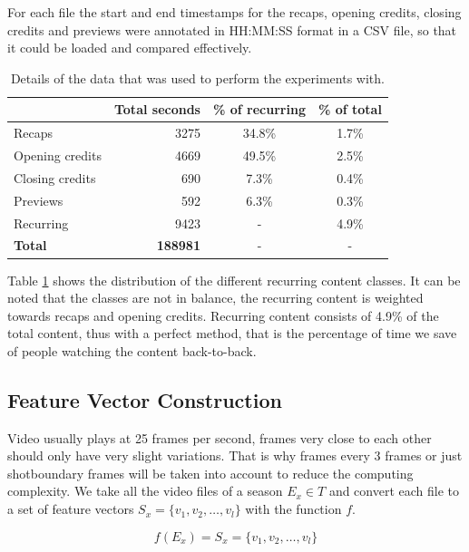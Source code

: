 \documentclass{article}
\begin{document}
For each file the start and end timestamps for the recaps, opening credits, closing credits and previews were annotated in HH:MM:SS format in a CSV file, so that it could be loaded and compared effectively.

\begin{table}[h]
	\begin{adjustwidth}{-.5in}{-.5in}  
		\begin{center}
			\begin{tabular}{ l | r c c}
								& Total seconds & \% of recurring 	& \% of total \\
				\hline
				Recaps 			& 3275 			& 34.8\% 			& 1.7\% \\
				Opening credits	& 4669			& 49.5\%			& 2.5\%	\\
				Closing credits	& 690			& 7.3\%				& 0.4\%	\\
				Previews		& 592			& 6.3\%				& 0.3\% \\
				\hline
				Recurring		& 9423			& -					& 4.9\% \\
				\textbf{Total}	& \textbf{188981}		& -					& -
			\end{tabular}
		\end{center}
	\end{adjustwidth}
	\caption{Details of the data that was used to perform the experiments with.}
	\label{table:datastatistics}
\end{table}

Table \ref{table:datastatistics} shows the distribution of the different recurring content classes. It can be noted that the classes are not in balance, the recurring content is weighted towards recaps and opening credits. Recurring content consists of 4.9\% of the total content, thus with a perfect method, that is the percentage of time we save of people watching the content back-to-back.

\subsection{Feature Vector Construction}
Video usually plays at 25 frames per second, frames very close to each other should only have very slight variations. That is why frames every 3 frames or just shotboundary frames will be taken into account to reduce the computing complexity. We take all the video files of a season $E_x \in T$ and convert each file to a set of feature vectors $S_x = \{v_1, v_2, \dots, v_l\}$ with the function $f$.

\[f(E_x) = S_x = \{v_1, v_2, \dots, v_l\}\]
\end{document}
